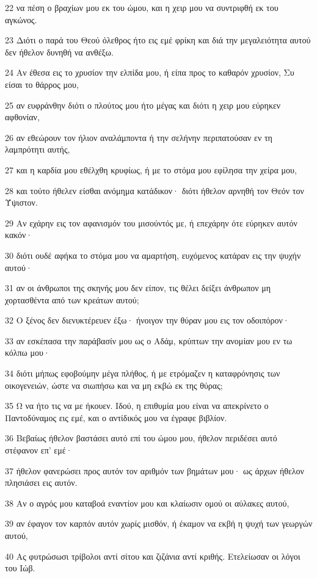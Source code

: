 \par 22 να πέση ο βραχίων μου εκ του ώμου, και η χειρ μου να συντριφθή εκ του αγκώνος.
\par 23 Διότι ο παρά του Θεού όλεθρος ήτο εις εμέ φρίκη και διά την μεγαλειότητα αυτού δεν ήθελον δυνηθή να ανθέξω.
\par 24 Αν έθεσα εις το χρυσίον την ελπίδα μου, ή είπα προς το καθαρόν χρυσίον, Συ είσαι το θάρρος μου,
\par 25 αν ευφράνθην διότι ο πλούτος μου ήτο μέγας και διότι η χειρ μου εύρηκεν αφθονίαν,
\par 26 αν εθεώρουν τον ήλιον αναλάμποντα ή την σελήνην περιπατούσαν εν τη λαμπρότητι αυτής,
\par 27 και η καρδία μου εθέλχθη κρυφίως, ή με το στόμα μου εφίλησα την χείρα μου,
\par 28 και τούτο ήθελεν είσθαι ανόμημα κατάδικον· διότι ήθελον αρνηθή τον Θεόν τον Ύψιστον.
\par 29 Αν εχάρην εις τον αφανισμόν του μισούντός με, ή επεχάρην ότε εύρηκεν αυτόν κακόν·
\par 30 διότι ουδέ αφήκα το στόμα μου να αμαρτήση, ευχόμενος κατάραν εις την ψυχήν αυτού·
\par 31 αν οι άνθρωποι της σκηνής μου δεν είπον, τις θέλει δείξει άνθρωπον μη χορτασθέντα από των κρεάτων αυτού;
\par 32 Ο ξένος δεν διενυκτέρευεν έξω· ήνοιγον την θύραν μου εις τον οδοιπόρον·
\par 33 αν εσκέπασα την παράβασίν μου ως ο Αδάμ, κρύπτων την ανομίαν μου εν τω κόλπω μου·
\par 34 διότι μήπως εφοβούμην μέγα πλήθος, ή με ετρόμαζεν η καταφρόνησις των οικογενειών, ώστε να σιωπήσω και να μη εκβώ εκ της θύρας;
\par 35 Ω να ήτο τις να με ήκουεν. Ιδού, η επιθυμία μου είναι να απεκρίνετο ο Παντοδύναμος εις εμέ, και ο αντίδικός μου να έγραφε βιβλίον.
\par 36 Βεβαίως ήθελον βαστάσει αυτό επί του ώμου μου, ήθελον περιδέσει αυτό στέφανον επ' εμέ·
\par 37 ήθελον φανερώσει προς αυτόν τον αριθμόν των βημάτων μου· ως άρχων ήθελον πλησιάσει εις αυτόν.
\par 38 Αν ο αγρός μου καταβοά εναντίον μου και κλαίωσιν ομού οι αύλακες αυτού,
\par 39 αν έφαγον τον καρπόν αυτόν χωρίς μισθόν, ή έκαμον να εκβή η ψυχή των γεωργών αυτού,
\par 40 Ας φυτρώσωσι τρίβολοι αντί σίτου και ζιζάνια αντί κριθής. Ετελείωσαν οι λόγοι του Ιώβ.

